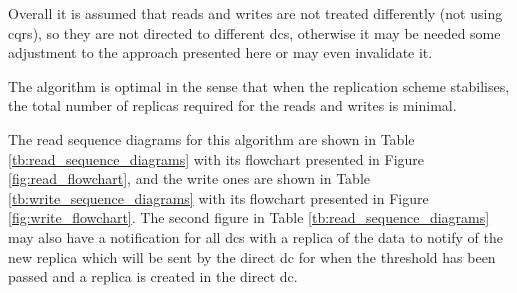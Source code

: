 \documentclass[english]{article}
\begin{document}
Overall it is assumed that reads and writes are not treated differently (not using \gls{cqrs}), so they are not directed to different \glspl{dc}, otherwise it may be needed some adjustment to the approach presented here or may even invalidate it.

The algorithm is optimal in the sense that when the replication scheme stabilises, the total number of replicas required for the reads and writes is minimal.

The read sequence diagrams for this algorithm are shown in Table \ref{tb:read_sequence_diagrams} with its flowchart presented in Figure \ref{fig:read_flowchart}, and the write ones are shown in Table \ref{tb:write_sequence_diagrams} with its flowchart presented in Figure \ref{fig:write_flowchart}. The second figure in Table \ref{tb:read_sequence_diagrams} may also have a notification for all \glspl{dc} with a replica of the data to notify of the new replica which will be sent by the direct \gls{dc} for when the threshold has been passed and a replica is created in the direct \gls{dc}.
\end{document}
